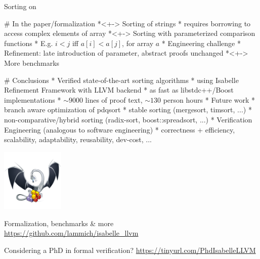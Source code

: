 \documentclass[fleqn]{beamer}
\begin{document}
  Sorting  on

# In the paper/formalization
  *<+-> Sorting of strings
    * requires borrowing to access complex elements of array
  *<+-> Sorting with parameterized comparison functions
    * E.g. $i<j$ iff $a[i]<a[j]$, for array $a$
    * Engineering challenge
    * Refinement: late introduction of parameter, abstract proofs unchanged
  *<+-> More benchmarks


# Conclusions
  * Verified state-of-the-art sorting algorithms
    * using Isabelle Refinement Framework with LLVM backend
    * as fast as libstdc++/Boost implementations
    * $\sim9000$ lines of proof text, $\sim130$ person hours
  * Future work
    * branch aware optimization of pdqsort
    * stable sorting (mergesort, timsort, ...)
    * non-comparative/hybrid sorting (radix-sort, boost::spreadsort, ...)
      \medskip
    * Verification Engineering (analogous to software engineering)
      * {\color{green} correctness} + efficiency, scalability, adaptability, reusability, dev-cost, ...

  \vfill

  \includegraphics[width=3cm,align=c]{isabelle-llvm.png}~~\begin{minipage}{.7\textwidth}
    \color{black}Formalization, benchmarks \& more\\
    \url{https://github.com/lammich/isabelle_llvm}
  \end{minipage}

  \vfill
  Considering a PhD in formal verification? \url{https://tinyurl.com/PhdIsabelleLLVM}
\end{document}
